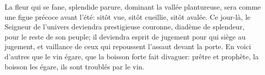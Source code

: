 La fleur qui se fane, splendide parure, dominant la vallée plantureuse,
	sera comme une figue précoce avant l’été:
	sitôt vue, sitôt cueillie, sitôt avalée.
Ce jour-là, le Seigneur de l’univers
		deviendra prestigieuse couronne, diadème de splendeur,
	pour le reste de son peuple;
	il deviendra esprit de jugement pour qui siège au jugement,
	et vaillance de ceux qui repoussent l’assaut devant la porte.
En voici d’autres que le vin égare, que la boisson forte fait divaguer:
	prêtre et prophète, la boisson les égare, ils sont troublés par le vin.
